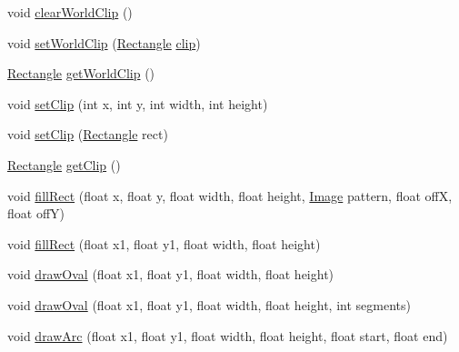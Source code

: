 \begin{DoxyCompactItemize}
\item 
void \mbox{\hyperlink{classorg_1_1newdawn_1_1slick_1_1_graphics_af41755aa81efa87811b38a8817c3e1d0}{clear\+World\+Clip}} ()
\item 
void \mbox{\hyperlink{classorg_1_1newdawn_1_1slick_1_1_graphics_aad20f40f216344f260cc2bb4d81bc943}{set\+World\+Clip}} (\mbox{\hyperlink{classorg_1_1newdawn_1_1slick_1_1geom_1_1_rectangle}{Rectangle}} \mbox{\hyperlink{classorg_1_1newdawn_1_1slick_1_1_graphics_ad6d9618b35d844e23f1a27b45491020a}{clip}})
\item 
\mbox{\hyperlink{classorg_1_1newdawn_1_1slick_1_1geom_1_1_rectangle}{Rectangle}} \mbox{\hyperlink{classorg_1_1newdawn_1_1slick_1_1_graphics_a706f6649bce845c7e1d40ffefbcd08b8}{get\+World\+Clip}} ()
\item 
void \mbox{\hyperlink{classorg_1_1newdawn_1_1slick_1_1_graphics_abeab2710876092eecc384bc6221203e5}{set\+Clip}} (int x, int y, int width, int height)
\item 
void \mbox{\hyperlink{classorg_1_1newdawn_1_1slick_1_1_graphics_ae655a4045ad6ea2ba27a476da4362295}{set\+Clip}} (\mbox{\hyperlink{classorg_1_1newdawn_1_1slick_1_1geom_1_1_rectangle}{Rectangle}} rect)
\item 
\mbox{\hyperlink{classorg_1_1newdawn_1_1slick_1_1geom_1_1_rectangle}{Rectangle}} \mbox{\hyperlink{classorg_1_1newdawn_1_1slick_1_1_graphics_a880590863b93a28508926c4028caec0d}{get\+Clip}} ()
\item 
void \mbox{\hyperlink{classorg_1_1newdawn_1_1slick_1_1_graphics_abf60283053540c66f00a722ebacb59a4}{fill\+Rect}} (float x, float y, float width, float height, \mbox{\hyperlink{classorg_1_1newdawn_1_1slick_1_1_image}{Image}} pattern, float offX, float offY)
\item 
void \mbox{\hyperlink{classorg_1_1newdawn_1_1slick_1_1_graphics_ae6bf6995a6ea58569e8879e00ce8e365}{fill\+Rect}} (float x1, float y1, float width, float height)
\item 
void \mbox{\hyperlink{classorg_1_1newdawn_1_1slick_1_1_graphics_a5418dd30e2cb23a5ce5807561a51f9ee}{draw\+Oval}} (float x1, float y1, float width, float height)
\item 
void \mbox{\hyperlink{classorg_1_1newdawn_1_1slick_1_1_graphics_aa05aa524cbfcf44a70c9da8f314c39a3}{draw\+Oval}} (float x1, float y1, float width, float height, int segments)
\item 
void \mbox{\hyperlink{classorg_1_1newdawn_1_1slick_1_1_graphics_aff0300433dbe9ce3c4d73ee73173dba4}{draw\+Arc}} (float x1, float y1, float width, float height, float start, float end)

\end{DoxyCompactItemize}
